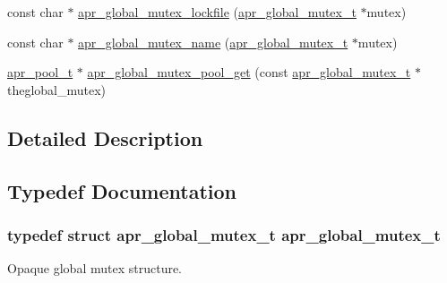 \begin{DoxyCompactItemize}
\item 
const char $\ast$ \hyperlink{group___a_p_r___global_mutex_ga0d14b6c80cc39bb76f6a038fff1ef5ad}{apr\-\_\-global\-\_\-mutex\-\_\-lockfile} (\hyperlink{group___a_p_r___global_mutex_ga3fc7dc5b076533ee566aa4888ac35ee7}{apr\-\_\-global\-\_\-mutex\-\_\-t} $\ast$mutex)
\item 
const char $\ast$ \hyperlink{group___a_p_r___global_mutex_gaf4ec155e8b9c6f30a979bc0aeb3721cb}{apr\-\_\-global\-\_\-mutex\-\_\-name} (\hyperlink{group___a_p_r___global_mutex_ga3fc7dc5b076533ee566aa4888ac35ee7}{apr\-\_\-global\-\_\-mutex\-\_\-t} $\ast$mutex)
\item 
\hyperlink{group__apr__pools_gaf137f28edcf9a086cd6bc36c20d7cdfb}{apr\-\_\-pool\-\_\-t} $\ast$ \hyperlink{group___a_p_r___global_mutex_ga01d5c1bbb32b976083b9c8234b04cd46}{apr\-\_\-global\-\_\-mutex\-\_\-pool\-\_\-get} (const \hyperlink{group___a_p_r___global_mutex_ga3fc7dc5b076533ee566aa4888ac35ee7}{apr\-\_\-global\-\_\-mutex\-\_\-t} $\ast$theglobal\-\_\-mutex)
\end{DoxyCompactItemize}


\subsection{Detailed Description}


\subsection{Typedef Documentation}
\hypertarget{group___a_p_r___global_mutex_ga3fc7dc5b076533ee566aa4888ac35ee7}{
\subsubsection[{apr\-\_\-global\-\_\-mutex\-\_\-t}]{\setlength{\rightskip}{0pt plus 5cm}typedef struct {\bf apr\-\_\-global\-\_\-mutex\-\_\-t} {\bf apr\-\_\-global\-\_\-mutex\-\_\-t}}}\label{group___a_p_r___global_mutex_ga3fc7dc5b076533ee566aa4888ac35ee7}
Opaque global mutex structure. 

